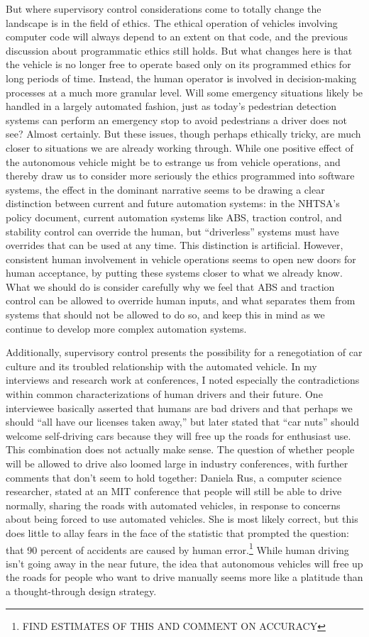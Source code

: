 But where supervisory control considerations come to totally change
the landscape is in the field of ethics. The ethical operation of
vehicles involving computer code will always depend to an extent on
that code, and the previous discussion about programmatic ethics still
holds. But what changes here is that the vehicle is no longer free to
operate based only on its programmed ethics for long periods of time.
Instead, the human operator is involved in decision-making processes
at a much more granular level. Will some emergency situations likely
be handled in a largely automated fashion, just as today's pedestrian
detection systems can perform an emergency stop to avoid pedestrians a
driver does not see? Almost certainly. But these issues, though
perhaps ethically tricky, are much closer to situations we are already
working through. While one positive effect of the autonomous vehicle
might be to estrange us from vehicle operations, and thereby draw us
to consider more seriously the ethics programmed into software
systems, the effect in the dominant narrative seems to be drawing a
clear distinction between current and future automation systems:  in
the NHTSA's policy document, current automation systems like ABS,
traction control, and stability control can override the human, but
``driverless'' systems must have overrides that can be used at any
time\cite[p. ??]{NHTSA}. This distinction is artificial. However,
consistent human involvement in vehicle operations seems to open new
doors for human acceptance, by putting these systems closer to what we
already know. What we should do is consider carefully why we feel that
ABS and traction control can be allowed to override human inputs, and
what separates them from systems that should not be allowed to do so, and
keep this in mind as we continue to develop more complex automation systems.

Additionally, supervisory control presents the possibility for a renegotiation of car
culture and its troubled relationship with the automated vehicle. In
my interviews and research work at conferences, I noted especially the
contradictions within common characterizations of human
drivers and their future. One interviewee basically asserted that
humans are bad drivers and that perhaps we should ``all have our
licenses taken away,'' but later stated that ``car nuts'' should
welcome self-driving cars because they will free up the roads for
enthusiast use. This combination does not actually make sense. The
question of whether people will be allowed to drive also loomed large
in industry conferences, with further comments that don't seem to hold
together: Daniela Rus, a computer science researcher, stated at an MIT
conference that people will still be able to drive normally, sharing
the roads with automated vehicles, in response to concerns about being
forced to use automated vehicles. She is most likely correct, but this
does little to allay fears in the face of the statistic that prompted
the question: that 90 percent of accidents are caused by human
error.\footnote{FIND ESTIMATES OF THIS AND COMMENT ON ACCURACY} While
human driving isn't going away in the near future, the idea that
autonomous vehicles will free up the roads for people who want to
drive manually seems more like a platitude than a thought-through
design strategy. 

